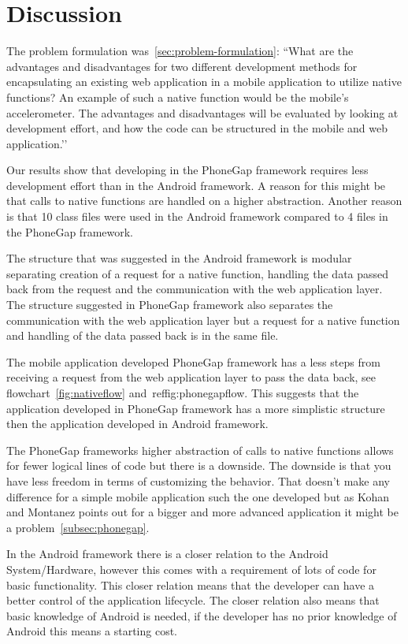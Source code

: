 \chapter{Discussion} \label{ch:discussion}
The problem formulation was~\ref{sec:problem-formulation}:
``What are the advantages and disadvantages for two different development methods for encapsulating an existing web application in a mobile application to utilize native functions? An example of such a native function would be the mobile's accelerometer. The advantages and disadvantages will be evaluated by looking at development effort, and how the code can be structured in the mobile and web application.’’

Our results show that developing in the PhoneGap framework requires less development effort than in the Android framework. A reason for this might be that calls to native functions are handled on a higher abstraction. Another reason is that 10 class files were used in the Android framework compared to 4 files in the PhoneGap framework.

The structure that was suggested in the Android framework is modular separating creation of a request for a native function, handling the data passed back from the request and the communication with the web application layer. The structure suggested in PhoneGap framework also separates the communication with the web application layer but a request for a native function and handling of the data passed back is in the same file. 

The mobile application developed PhoneGap framework has a less steps from receiving a request from the web application layer to pass the data back, see flowchart~\ref{fig:nativeflow} and~ref{fig:phonegapflow}. This suggests that the application developed in PhoneGap framework has a more simplistic structure then the application developed in Android framework.

The PhoneGap frameworks higher abstraction of calls to native functions allows for fewer logical lines of code but there is a downside. The downside is that you have less freedom in terms of customizing the behavior. That doesn’t make any difference for a simple mobile application such the one developed but as Kohan and Montanez points out for a bigger and more advanced application it might be a problem~\ref{subsec:phonegap}. 

In the Android framework there is a closer relation to the Android System/Hardware, however this comes with a requirement of lots of code for basic functionality. This closer relation means that the developer can have a better control of the application lifecycle. The closer relation also means that basic knowledge of Android is needed, if the developer has no prior knowledge of Android this means a starting cost. 

